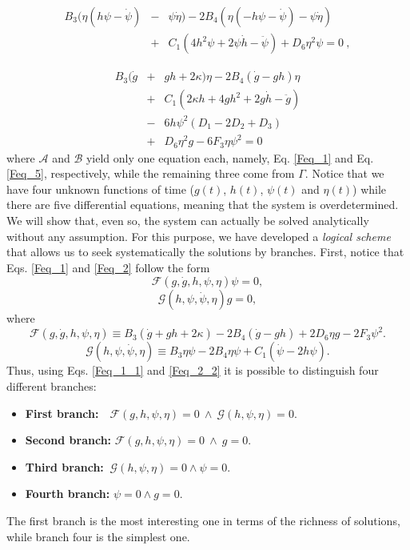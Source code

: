 \documentclass[epj]{svjour}
\begin{document}
\begin{eqnarray}
    \label{Feq_4}
    B_3(\eta(h\psi -\dot{\psi}) &-&\psi\dot{\eta}) - 2B_4(\eta(-h\psi - \dot{\psi}) - \psi\dot{\eta})   \\ &+& C_1(4h^2\psi + 2\psi\dot{h} -\ddot{\psi}) + D_6\eta^2\psi = 0 \ ,\nonumber 
\end{eqnarray}

\begin{eqnarray}
    \label{Feq_5}
    B_3(\dot{g} &+& gh + 2\kappa)\eta - 2B_4\left(\dot{g} - gh\right)\eta \nonumber \\ &+& C_1(2\kappa h + 4gh^2  + 2g\dot{h}- \ddot{g}) \nonumber \\ &-& 6h\psi^2\left(D_1 - 2D_2 + D_3\right) \nonumber \\ &+& D_6 \eta^2 g - 6F_3\eta\psi^2 = 0
\end{eqnarray}
where $\mathcal{A}$ and $\mathcal{B}$ yield only one equation each, namely,  Eq. \eqref{Feq_1} and Eq. \eqref{Feq_5}, respectively, 
while the remaining three come from $\Gamma$. Notice that we have four unknown functions 
of time ($g(t)$, $h(t)$, $\psi(t)$ and $\eta(t)$) while there are five differential equations, meaning that the system is overdetermined. We will show that, even so, the system can actually be solved analytically without any assumption. For this purpose, we have developed a \textit{logical scheme} that allows us to seek systematically the solutions by branches. First, notice that Eqs. \eqref{Feq_1} 
and \eqref{Feq_2} follow the form
\begin{dmath}
    \label{Feq_1_1}
    \mathcal{F}(g, \dot{g}, h,\psi,\eta)\psi = 0,
\end{dmath}
\begin{dmath}
    \label{Feq_2_2}
    \mathcal{G}(h,\psi, \dot{\psi}, \eta)g = 0,
\end{dmath}
where
\begin{dmath}
\mathcal{F}(g,\dot{g},h,\psi,\eta)  \equiv B_3\left(\dot{g} + gh + 2\kappa\right) - 2B_4\left(\dot{g} - gh\right) + 2D_6\eta g - 2F_3\psi^2.
\end{dmath}
\begin{dmath}
\mathcal{G}(h,\psi, \dot{\psi}, \eta)  \equiv B_3\eta\psi -2B_4\eta\psi + C_1\left(\dot{\psi} - 2h\psi\right).
\end{dmath}
Thus, using Eqs. \eqref{Feq_1_1} and \eqref{Feq_2_2} it is possible to distinguish four different branches:
\begin{itemize}
    \item {\bf First branch:}  { $ \ \ \ \mathcal{F}(g,h,\psi,\eta) \! = 0 \ \wedge \ \mathcal{G}(h,\psi,\eta) \!= \! 0$}.
    \item {\bf Second branch:} $ \mathcal{F}(g,h,\psi,\eta)  = 0 \ \wedge \ g  = 0$.
    \item {\bf Third branch:}   $\ \mathcal{G}(h,\psi,\eta)   = 0   \wedge  \psi  = 0$.
    \item {\bf Fourth branch:} $\psi  = 0  \wedge  g  = 0$.
\end{itemize}
The first branch is the most interesting one in terms of the richness of solutions, while branch four is the simplest one. 
\end{document}
